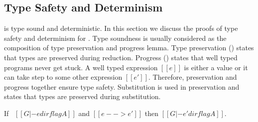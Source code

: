 \subsection{Type Safety and Determinism}
\label{sec:union:safety}
\cal is type sound and deterministic. In this section we discuss the
proofs of type safety and determinism for \cal. Type soundness is usually
considered as the composition of type preservation and progress
lemma. Type preservation () states that
types are preserved during reduction. Progress
() states that well typed programs never get
stuck.  A well typed expression $[[e]]$ is either a value or it can
take step to some other expression $[[e']]$. Therefore, preservation and progress
together ensure type safety.
Substitution  is used in preservation and 
states that types are preserved during substitution.

\begin{lemma}
\label{lemma:union:preservation}
  If \ $[[G |- e dirflag A]]$ and $[[e --> e']]$ then $[[G |- e' dirflag A]]$.
\end{lemma}

\begin{comment}
\begin{proof}
  By induction on typing relation and subsequent inverting reduction relation.
  \begin{itemize}
    \item Cases \rref{typ-int, typ-var, typ-sub, typ-abs} are trivial to prove.
    \item Case \rref{typ-ann} requires helping \cref{lemma:union:check-pexpr-ann}.
    \item Case \rref{typ-app} requires helping \cref{lemma:union:pexpr-check-sub}
          and substitution \cref{lemma:union:substitution} for beta reduction.
    \item Case \rref{typ-typeof} requires substitution \cref{lemma:union:substitution}.
  \end{itemize}
\end{proof}

\baber{ToDo: change name of helping lemmas.}

\begin{lemma}[check-pexpr-ann]
\label{lemma:union:check-pexpr-ann}
  If \ $[[G |- p:C <= A]]$ \ then \ $[[G |- p <= A]]$.
\end{lemma}

\begin{lemma}[pexpr-check-sub]
\label{lemma:union:pexpr-check-sub}
  If \ $[[G |- p <= A]]$ \ and \ $[[A <: B]]$ \ then \ $[[G |- p <= B]]$.
\end{lemma}
\end{comment}


